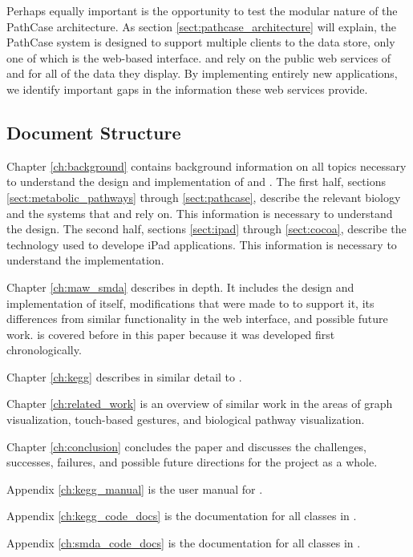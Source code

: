 Perhaps equally important is the opportunity to test the modular nature of the
PathCase architecture. As section \ref{sect:pathcase_architecture} will explain,
the PathCase system is designed to support multiple clients to the data store,
only one of which is the web-based interface. \keggapp and \mawapp rely on the
public web services of \pathcasekegg and \pathcasemaw for all of the data they
display. By implementing entirely new applications, we identify important gaps
in the information these web services provide.

\subsection{Document Structure}

Chapter \ref{ch:background} contains background information on all topics
necessary to understand the design and implementation of \keggapp and \mawapp.
The first half, sections \ref{sect:metabolic_pathways} through
\ref{sect:pathcase}, describe the relevant biology and the systems that \keggapp
and \mawapp rely on. This information is necessary to understand the design. The
second half, sections \ref{sect:ipad} through \ref{sect:cocoa}, describe the
technology used to develope iPad applications. This information is necessary to
understand the implementation.

Chapter \ref{ch:maw_smda} describes \mawapp in depth. It includes the design and
implementation of \mawapp itself, modifications that were made to \pathcasemaw
to support it, its differences from similar functionality in the \pathcasemaw
web interface, and possible future work. \mawapp is covered before \keggapp
in this paper because it was developed first chronologically.

Chapter \ref{ch:kegg} describes \keggapp in similar detail to \mawapp.

Chapter \ref{ch:related_work} is an overview of similar work in the areas of
graph visualization, touch-based gestures, and biological pathway visualization.

Chapter \ref{ch:conclusion} concludes the paper and discusses the challenges,
successes, failures, and possible future directions for the project as a whole.

Appendix \ref{ch:kegg_manual} is the user manual for \keggapp.

Appendix \ref{ch:kegg_code_docs} is the documentation for all classes in
\mawapp.

Appendix \ref{ch:smda_code_docs} is the documentation for all classes in
\keggapp.
